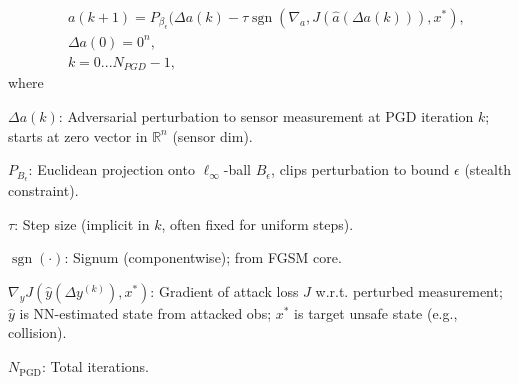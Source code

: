 \begin{definition}
	\begin{equation}
		\begin{aligned}
			 & a(k+1) = P_{\beta_{\epsilon}}(\Delta a(k) - \tau\operatorname{sgn}(\nabla_{a}, J( \hat{a}(\Delta a(k))), x^{*})\text{,} \\
			 & \Delta a(0) = 0^{n}\text{,}                                                                                     \\
			 & k = 0 ...N_{PGD} - 1\text{,}
		\end{aligned}
	\end{equation}
	\noindent where

	\begin{description}
		\setlength{\itemsep}{0.35em}
		\item $\Delta a(k)$: Adversarial perturbation to sensor measurement at PGD iteration $k$; starts at zero vector in $\mathbb{R}^n$ (sensor dim).
		\item $P_{B_\epsilon}$: Euclidean projection onto $\ell_\infty$-ball $B_\epsilon$, clips perturbation to bound $\epsilon$ (stealth constraint).
		\item $\tau$: Step size (implicit in $k$, often fixed for uniform steps).
		\item $\operatorname{sgn}(\cdot)$: Signum (componentwise); from FGSM core.
		\item $\nabla_y J(\hat{y}(\Delta y^{(k)}), x^*)$: Gradient of attack loss $J$ w.r.t. perturbed measurement; $\hat{y}$ is NN-estimated state from attacked obs; $x^*$ is target unsafe state (e.g., collision).
		\item $N_{\text{PGD}}$: Total iterations.
	\end{description}
\end{definition}

